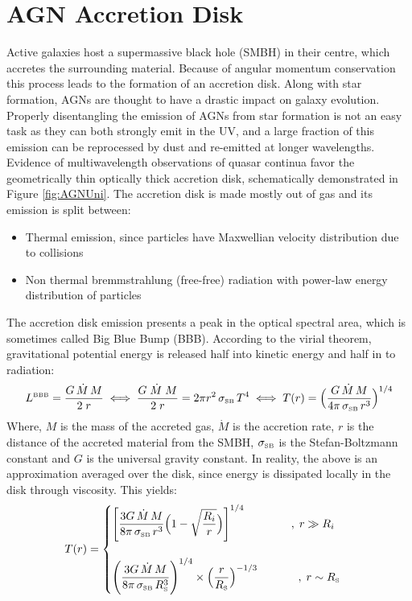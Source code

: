 \section{AGN Accretion Disk}
Active galaxies host a supermassive black hole (SMBH) in their centre, which accretes the surrounding material. Because of angular momentum conservation this process leads to the formation of an accretion disk. Along with star formation, AGNs are thought to have a drastic impact on galaxy evolution. Properly disentangling the emission of AGNs from star formation is not an easy task as they can both strongly emit in the UV, and a large fraction of this emission can be reprocessed by dust and re-emitted at longer wavelengths.\\
Evidence of multiwavelength observations of quasar continua favor the geometrically thin optically thick accretion disk\cite{Malkan1983}, schematically demonstrated in Figure \ref{fig:AGNUni}. The accretion disk is made mostly out of gas and its emission is split\cite{Malkan1983} between:
\begin{itemize}
    \item Thermal emission, since particles have Maxwellian velocity distribution
due to collisions
    \item Non thermal bremmstrahlung (free-free) radiation with power-law energy distribution of particles\cite{Barvainis1993}
\end{itemize}
The accretion disk emission presents a peak in the optical spectral area, which is sometimes called Big Blue Bump (BBB). According to the virial theorem, gravitational potential energy is released half into kinetic energy and half in to radiation:
\begin{equation}
    L^{\mbox{\tiny{BBB}}} = \dfrac{ G \, \dot{M} \, M }{2\; r} \iff \dfrac{ G \; \dot{M} \; M }{2\; r} = 2 \pi r^2 \, \sigma_{\mbox{\tiny{SB}}} \, T^4 \iff T(r) = \Big(\dfrac{G \,\dot{M} \, M}{4\pi \,  \sigma_{\mbox{\tiny{SB}}} \, r^3 } \Big)^{1/4}
\end{equation}
Where, $M$ is the mass of the accreted gas, $\dot{M}$ is the accretion rate, $r$ is the distance of the accreted material from the SMBH, $\sigma_{\mbox{\tiny{SB}}}$ is the Stefan-Boltzmann constant and $G$ is the universal gravity constant.
In reality, the above is an approximation averaged over the disk, since energy is dissipated locally in the disk through viscosity. This yields:
\begin{equation}
     T(r)  = \begin{cases}   
     \Bigg[ \dfrac{3G \,\dot{M} \, M}{8\pi \,  \sigma_{\mbox{\tiny{SB}}} \, r^3 } \Big( 1- \sqrt{\dfrac{R_i}{r}}  \Big) \Bigg]^{1/4}   \;\;\; \;\;\;\;\;\;\;\;\;\;\;\;,\; r \gg R_i \\ \\ 
     \Bigg(\dfrac{3G \,\dot{M} \, M}{8\pi \,  \sigma_{\mbox{\tiny{SB}}} \, R_{\mbox{\tiny{S}}}^3 } \Bigg)^{1/4} \times \Big(  \dfrac{r}{R_{\mbox{\tiny{S}}}}  \Big)^{-1/3}  \;\;\;\;\;\;\;\;\;\;\;\;\; ,\;     r \sim R_{\mbox{\tiny{S}}} \end{cases}
\end{equation}
